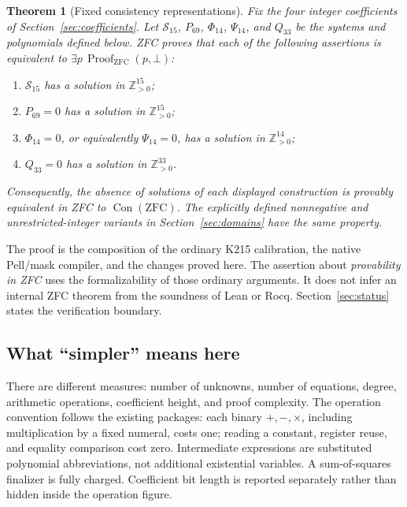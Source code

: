 \documentclass[11pt,a4paper]{article}
\newtheorem{theorem}{Theorem}[section]
\theoremstyle{remark}\newtheorem{remark}[theorem]{Remark}
\newcommand{\Pos}{\mathbb Z_{>0}}
\newcommand{\Con}{\operatorname{Con}}
\begin{document}
\begin{theorem}[Fixed consistency representations]\label{thm:main}
Fix the four integer coefficients of Section~\ref{sec:coefficients}.
Let \(\mathcal S_{15}\), \(P_{69}\), \(\Phi_{14}\), \(\Psi_{14}\),
and \(Q_{33}\) be the systems and polynomials defined below. ZFC proves
that each of the following assertions is equivalent to
\(\exists p\,\operatorname{Proof}_{\mathrm{ZFC}}(p,\bot)\):
\begin{enumerate}
\item \(\mathcal S_{15}\) has a solution in \(\Pos^{15}\);
\item \(P_{69}=0\) has a solution in \(\Pos^{15}\);
\item \(\Phi_{14}=0\), or equivalently \(\Psi_{14}=0\), has a solution
in \(\Pos^{14}\);
\item \(Q_{33}=0\) has a solution in \(\Pos^{33}\).
\end{enumerate}
Consequently, the absence of solutions of each displayed construction is
provably equivalent in ZFC to \(\Con(\mathrm{ZFC})\).
The explicitly defined nonnegative and unrestricted-integer variants in
Section~\ref{sec:domains} have the same property.
\end{theorem}

The proof is the composition of the ordinary K215 calibration, the
native Pell/mask compiler, and the changes proved here. The assertion
about \emph{provability in ZFC} uses the formalizability of those ordinary
arguments. It does not infer an internal ZFC theorem from the soundness
of Lean or Rocq. Section~\ref{sec:status} states the verification boundary.

\subsection{What ``simpler'' means here}
There are different measures: number of unknowns, number of equations,
degree, arithmetic operations, coefficient height, and proof complexity.
The operation convention follows the existing packages: each binary
\(+,-,\times\), including multiplication by a fixed numeral, costs one;
reading a constant, register reuse, and equality comparison cost zero.
Intermediate expressions are substituted polynomial abbreviations, not
additional existential variables. A sum-of-squares finalizer is fully
charged. Coefficient bit length is reported separately rather than hidden
inside the operation figure.
\end{document}
